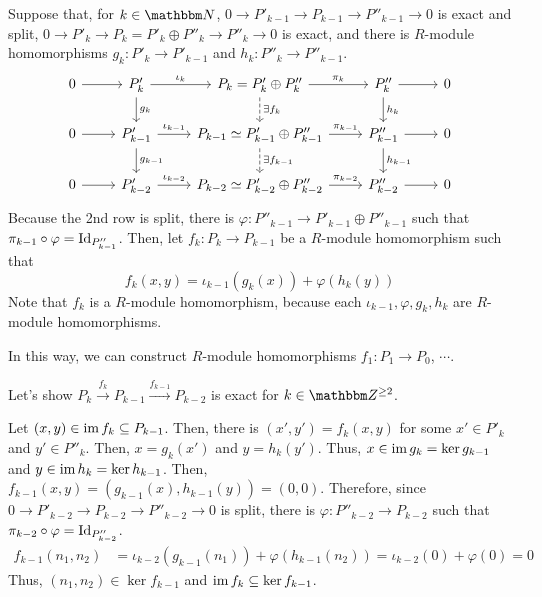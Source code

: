 Suppose that, for \(k \in \bbN\),
\(0 \to P'_{k - 1} \to P_{k - 1} \to P''_{k - 1} \to 0\) is exact and split,
\(0 \to P'_{k} \to P_{k} = P'_{k} \oplus P''_{k} \to P''_{k} \to 0\) is exact,
and there is \(R\)-module homomorphisms \(g_k: P'_k \to P'_{k - 1}\) and \(h_k: P''_k \to P''_{k - 1}\). 
\[\begin{tikzcd}
  0 \ar{r} & P'_k \ar["\iota_k"]{r} \ar["g_k"]{d} & P_k = P'_k \oplus P''_k \ar["\pi_k"]{r} \ar[dashed, "\exists f_k"]{d} & P''_k \ar{r} \ar["h_k"]{d} & 0 \\
  0 \ar{r} & P'_{k - 1} \ar["\iota_{k - 1}"]{r} \ar["g_{k - 1}"]{d} & P_{k - 1} \simeq P'_{k - 1} \oplus P''_{k - 1} \ar["\pi_{k - 1}"]{r} \ar[dashed, "\exists f_{k - 1}"]{d} & P''_{k - 1} \ar{r} \ar["h_{k - 1}"]{d} & 0 \\
  0 \ar{r} & P'_{k - 2} \ar["\iota_{k - 2}"]{r} & P_{k - 2} \simeq P'_{k - 2} \oplus P''_{k - 2} \ar["\pi_{k - 2}"]{r} & P''_{k - 2} \ar{r} & 0
\end{tikzcd}\]
Because the 2nd row is split, there is \(\varphi: P''_{k - 1} \to P'_{k - 1} \oplus P''_{k - 1}\) such that \(\pi_{k - 1} \circ \varphi = \textnormal{Id}_{P''_{k - 1}}\).
Then, let \(f_k: P_k \to P_{k - 1}\) be a \(R\)-module homomorphism such that
\[f_k(x, y) = \iota_{k - 1}(g_k(x)) + \varphi(h_k(y))\]
Note that \(f_k\) is a \(R\)-module homomorphism, because each \(\iota_{k - 1}, \varphi, g_k, h_k\) are \(R\)-module homomorphisms.

In this way, we can construct \(R\)-module homomorphisms \(f_1: P_1 \to P_0\), \(\cdots\).

Let's show \(P_k \xrightarrow{f_k} P_{k - 1} \xrightarrow{f_{k - 1}} P_{k - 2}\) is exact for \(k \in \bbZ^{\ge 2}\).

Let \((x, y) \in \textnormal{im}\, f_k \subseteq P_{k - 1}\).
Then, there is \((x', y') = f_k(x, y)\) for some \(x' \in P'_k\) and \(y' \in P''_k\).
Then, \(x = g_k(x')\) and \(y = h_k(y')\).
Thus, \(x \in \textnormal{im}\, g_k = \ker g_{k - 1}\) and \(y \in \textnormal{im}\, h_k = \ker h_{k - 1}\).
Then, \(f_{k - 1}(x, y) = (g_{k - 1}(x), h_{k - 1}(y)) = (0, 0)\).
Therefore, since \(0 \to P'_{k - 2} \to P_{k - 2} \to P''_{k - 2} \to 0\) is split, there is \(\varphi: P''_{k - 2} \to P_{k - 2}\) such that \(\pi_{k - 2} \circ \varphi = \textnormal{Id}_{P''_{k - 2}}\).
\begin{align*}
  f_{k - 1}(n_1, n_2)
  &= \iota_{k - 2}(g_{k - 1}(n_1)) + \varphi(h_{k - 1}(n_2))
  = \iota_{k - 2}(0) + \varphi(0) = 0
\end{align*}
Thus, \((n_1, n_2) \in \ker f_{k - 1}\) and \(\textnormal{im}\, f_k \subseteq \ker f_{k - 1}\).

